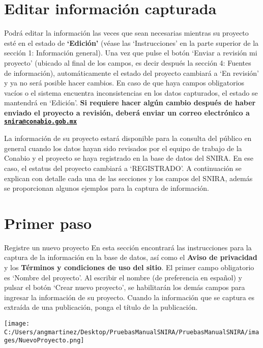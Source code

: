 \documentclass[
]{book}
\begin{document}
\hypertarget{editar-informaciuxf3n-capturada}{%
\section{Editar información capturada}\label{editar-informaciuxf3n-capturada}}

Podrá editar la información las veces que sean necesarias mientras su proyecto esté en el estado de \textbf{`Edición'} (véase las `Instrucciones' en la parte superior de la sección 1: Información general). Una vez que pulse el botón `Enviar a revisión mi proyecto' (ubicado al final de los campos, es decir después la sección 4: Fuentes de información), automáticamente el estado del proyecto cambiará a `En revisión' y ya no será posible hacer cambios. En caso de que haya campos obligatorios vacíos o el sistema encuentra inconsistencias en los datos capturados, el estado se mantendrá en `Edición'. \textbf{Si requiere hacer algún cambio después de haber enviado el proyecto a revisión, deberá enviar un correo electrónico a \href{mailto:snira@conabio.gob.mx}{\nolinkurl{snira@conabio.gob.mx}}}

La información de su proyecto estará disponible para la consulta del público en general cuando los datos hayan sido revisados por el equipo de trabajo de la Conabio y el proyecto se haya registrado en la base de datos del SNIRA. En ese caso, el estatus del proyecto cambiará a `REGISTRADO'.
A continuación se explican con detalle cada una de las secciones y los campos del SNIRA, además se proporcionan algunos ejemplos para la captura de información.

\hypertarget{primer-paso}{%
\section{Primer paso}\label{primer-paso}}

Registre un nuevo proyecto
En esta sección encontrará las instrucciones para la captura de la información en la base de datos, así como el \textbf{Aviso de privacidad} y los \textbf{Términos y condiciones de uso del sitio}.
El primer campo obligatorio es `Nombre del proyecto'. Al escribir el nombre (de preferencia en español) y pulsar el botón `Crear nuevo proyecto', se habilitarán los demás campos para ingresar la información de su proyecto. Cuando la información que se captura es extraída de una publicación, ponga el título de la publicación.

\texttt{[image: C:/Users/angmartinez/Desktop/PruebasManualSNIRA/PruebasManualSNIRA/images/NuevoProyecto.png]}
\end{document}
